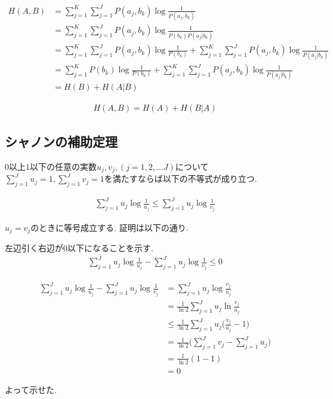 \documentclass[dvipdfmx, 10pt]{jsarticle}
\begin{document}
\begin{align*}
    H(A, B) 
    &= \sum_{j=1}^{K} \sum_{j=1}^{J} P(a_j, b_k) \log \frac{1}{P(a_j, b_k)} \\
    &= \sum_{j=1}^{K} \sum_{j=1}^{J} P(a_j, b_k) \log \frac{1}{P(b_k) P(a_j | b_k)} \\
    &= \sum_{j=1}^{K} \sum_{j=1}^{J} P(a_j, b_k) \log \frac{1}{P(b_k)} 
    + \sum_{j=1}^{K} \sum_{j=1}^{J} P(a_j, b_k) \log \frac{1}{P(a_j | b_k)} \\
    &= \sum_{j=1}^{K} P(b_k) \log \frac{1}{P(b_k)} 
    + \sum_{j=1}^{K} \sum_{j=1}^{J} P(a_j, b_k) \log \frac{1}{P(a_j | b_k)} \\
    & = H(B)+ H(A | B)
\end{align*}

\begin{align*}
    H(A, B) = H(A)+ H(B | A)
\end{align*}

\subsection*{シャノンの補助定理}
\(0\)以上\(1\)以下の任意の実数\(u_j, v_j, (j = 1, 2, \dots J)\)について
\(\sum_{j=1}^{J} u_j = 1, \sum_{j=1}^{J} v_j = 1\)を満たすならば以下の不等式が成り立つ. 

\begin{align*}
    \sum_{j=1}^{J} u_j \log \frac{1}{u_j} \leq \sum_{j=1}^{J} u_j \log \frac{1}{v_j}
\end{align*}

\(u_j = v_j\)のときに等号成立する. 証明は以下の通り. 

\begin{oframed}
    左辺引く右辺が\(0\)以下になることを示す. 
    \begin{align*}
        \sum_{j=1}^{J} u_j \log \frac{1}{u_j} - \sum_{j=1}^{J} u_j \log \frac{1}{v_j} \leq 0
    \end{align*}

    \begin{align*}
        \sum_{j=1}^{J} u_j \log \frac{1}{u_j} - \sum_{j=1}^{J} u_j \log \frac{1}{v_j} 
        &= \sum_{j=1}^{J} u_j \log \frac{v_j}{u_j} \\
        &= \frac{1}{\ln 2} \sum_{j=1}^{J} u_j \ln \frac{v_j}{u_j} \\
        &\leq \frac{1}{\ln 2} \sum_{j=1}^{J} u_j \Big(\frac{v_j}{u_j} -1 \Big) \\
        &= \frac{1}{\ln 2} \Big( \sum_{j=1}^{J} v_j - \sum_{j=1}^{J} u_j \Big) \\
        &= \frac{1}{\ln 2} (1 - 1) \\
        &= 0
    \end{align*}

    よって示せた. 
\end{oframed}
\end{document}
